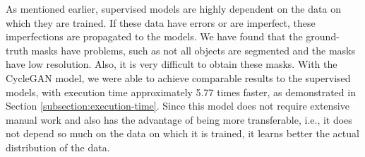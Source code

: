 As mentioned earlier, supervised models are highly dependent on the data on which they are trained. If these data have errors or are imperfect, these imperfections are propagated to the models. We have found that the ground-truth masks have problems, such as not all objects are segmented and the masks have low resolution. Also, it is very difficult to obtain these masks. With the CycleGAN model, we were able to achieve comparable results to the supervised models, with execution time approximately 5.77 times faster, as demonstrated in Section \ref{subsection:execution-time}. Since this model does not require extensive manual work and also has the advantage of being more transferable, i.e., it does not depend so much on the data on which it is trained, it learns better the actual distribution of the data.